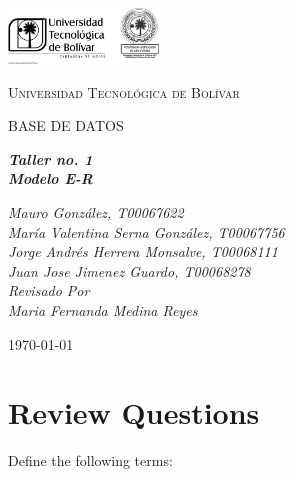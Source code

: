 \documentclass[letterpaper, 12pt]{report}
\begin{document}
\begin{titlepage}
	\centering
	\includegraphics[width=0.3\textwidth]{Images/logo_utb.png}\par\vspace{1cm}
	{\scshape\LARGE Universidad Tecnológica de Bolívar \par}
	\vspace{.5cm}

	{\scshape\Large BASE DE DATOS \par}
	\vspace{.7cm}

	\slshape {\Large \bfseries{}Taller no. 1\\}
	\slshape {\small \bfseries{}Modelo E-R}
	\vspace{1cm}

	\slshape {\itshape{} Mauro González, T00067622 \\}
	\slshape {\itshape{} María Valentina Serna González, T00067756 \\}
	\slshape {\itshape{} Jorge Andrés Herrera Monsalve, T00068111 \\}
	\slshape {\itshape{} Juan Jose Jimenez Guardo, T00068278 \\}
	\vfill
	Revisado Por \\
	Maria Fernanda Medina Reyes\\
	{\large \today\par}
\end{titlepage}

\section{Review Questions}

Define the following terms:
\end{document}
